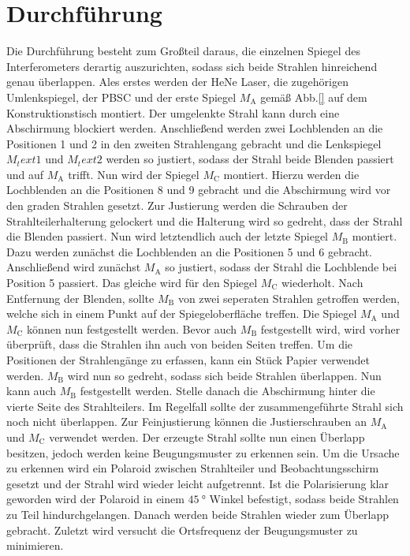 
\section{Durchführung}
\label{sec:Durchführung}
Die Durchführung besteht zum Großteil daraus, die einzelnen Spiegel des Interferometers derartig auszurichten, sodass sich beide Strahlen hinreichend genau überlappen.
Ales erstes werden der HeNe Laser, die zugehörigen Umlenkspiegel, der PBSC und der erste Spiegel $M_\text{A}$ gemäß Abb.\ref{} auf dem Konstruktionstisch montiert. Der umgelenkte Strahl kann durch eine Abschirmung blockiert werden. Anschließend werden zwei Lochblenden an die Positionen 1 und 2 in den zweiten Strahlengang gebracht und die Lenkspiegel $M_text{1}$ und $M_text{2}$ werden so justiert, sodass der Strahl beide Blenden passiert und auf $M_\text{A}$ trifft. Nun wird der Spiegel $M_\text{C}$ montiert. Hierzu werden die Lochblenden an die Positionen 8 und 9 gebracht und die Abschirmung wird vor den graden Strahlen gesetzt. 
Zur Justierung werden die Schrauben der Strahlteilerhalterung gelockert und die Halterung wird so gedreht, dass der Strahl die Blenden passiert. Nun wird letztendlich auch der letzte Spiegel $M_\text{B}$ montiert. Dazu werden zunächst die Lochblenden an die Positionen 5 und 6 gebracht. Anschließend wird zunächst $M_\text{A}$ so justiert, sodass der Strahl die Lochblende bei Position 5 passiert. Das gleiche wird für den Spiegel $M_\text{C}$ wiederholt. Nach Entfernung der Blenden, sollte $M_\text{B}$ von zwei seperaten Strahlen getroffen werden, welche sich in einem Punkt auf der Spiegeloberfläche treffen. Die Spiegel $M_\text{A}$ und $M_\text{C}$ können nun festgestellt werden. Bevor auch $M_\text{B}$ festgestellt wird, wird vorher überprüft, dass die Strahlen ihn auch von beiden Seiten treffen. Um die Positionen der Strahlengänge zu erfassen, kann ein Stück Papier verwendet werden. $M_\text{B}$ wird nun so gedreht, sodass sich beide Strahlen überlappen. Nun kann auch $M_\text{B}$ festgestellt werden. Stelle danach die Abschirmung hinter die vierte Seite des Strahlteilers. Im Regelfall sollte der zusammengeführte Strahl sich noch nicht überlappen. Zur Feinjustierung können die Justierschrauben an $M_\text{A}$ und $M_\text{C}$ verwendet werden. Der erzeugte Strahl sollte nun einen Überlapp besitzen, jedoch werden keine Beugungsmuster zu erkennen sein. Um die Ursache zu erkennen wird ein Polaroid zwischen Strahlteiler und Beobachtungsschirm gesetzt und der Strahl wird wieder leicht aufgetrennt. Ist die Polarisierung klar geworden wird der Polaroid in einem $\SI{45}{\degree}$ Winkel befestigt, sodass beide Strahlen zu Teil hindurchgelangen. Danach werden beide Strahlen wieder zum Überlapp gebracht. Zuletzt wird versucht die Ortsfrequenz der Beugungsmuster zu minimieren.   